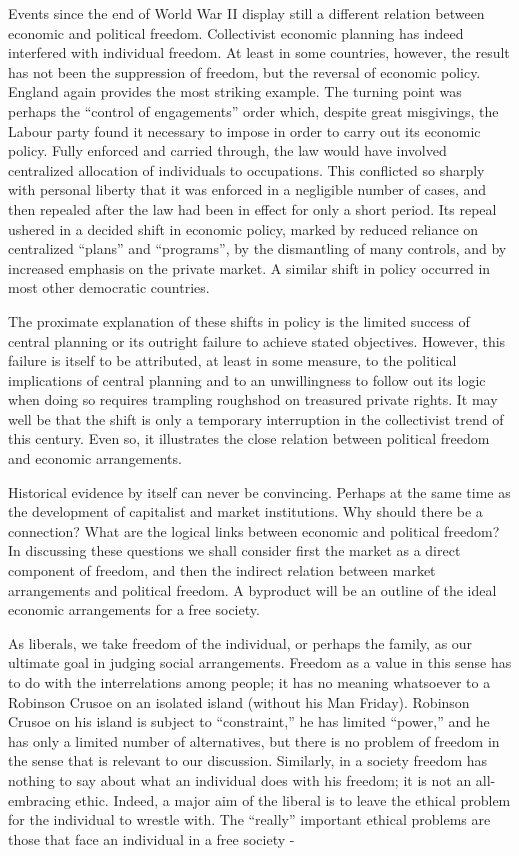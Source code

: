 \documentclass[11pt,openany]{book}
\begin{document}
Events since the end of World War II display still a different relation between economic and political freedom. Collectivist economic planning has indeed interfered with individual freedom. At least in some countries, however, the result has not been the suppression of freedom, but the reversal of economic policy. England again provides the most striking example. The turning point was perhaps the ``control of engagements'' order which, despite great misgivings, the Labour party found it necessary to impose in order to carry out its economic policy. Fully enforced and carried through, the law would have involved centralized allocation of individuals to occupations. This conflicted so sharply with personal liberty that it was enforced in a negligible number of cases, and then repealed after the law had been in effect for only a short period. Its repeal ushered in a decided shift in economic policy, marked by reduced reliance on centralized ``plans'' and ``programs'', by the dismantling of many controls, and by increased emphasis on the private market. A similar shift in policy occurred in most other democratic countries.

The proximate explanation of these shifts in policy is the limited success of central planning or its outright failure to achieve stated objectives. However, this failure is itself to be attributed, at least in some measure, to the political implications of central planning and to an unwillingness to follow out its logic when doing so requires trampling roughshod on treasured private rights. It may well be that the shift is only a temporary interruption in the collectivist trend of this century. Even so, it illustrates the close relation between political freedom and economic arrangements.

Historical evidence by itself can never be convincing. Perhaps at the same time as the development of capitalist and market institutions. Why should there be a connection? What are the logical links between economic and political freedom? In discussing these questions we shall consider first the market as a direct component of freedom, and then the indirect relation between market arrangements and political freedom. A byproduct will be an outline of the ideal economic arrangements for a free society.

As liberals, we take freedom of the individual, or perhaps the family, as our ultimate goal in judging social arrangements. Freedom as a value in this sense has to do with the interrelations among people; it has no meaning whatsoever to a Robinson Crusoe on an isolated island (without his Man Friday). Robinson Crusoe on his island is subject to ``constraint,'' he has limited ``power,'' and he has only a limited number of alternatives, but there is no problem of freedom in the sense that is relevant to our discussion. Similarly, in a society freedom has nothing to say about what an individual does with his freedom; it is not an all-embracing ethic. Indeed, a major aim of the liberal is to leave the ethical problem for the individual to wrestle with. The ``really'' important ethical problems are those that face an individual in a free society -
\end{document}
